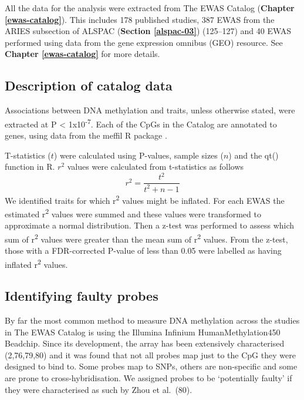 \documentclass[11pt,oneside]{bristolthesis}
\begin{document}
All the data for the analysis were extracted from The EWAS Catalog (\textbf{Chapter \ref{ewas-catalog}}). This includes 178 published studies, 387 EWAS from the ARIES subsection of ALSPAC (\textbf{Section \ref{alspac-03}}) (125--127) and 40 EWAS performed using data from the gene expression omnibus (GEO) resource. See \textbf{Chapter \ref{ewas-catalog}} for more details.

\hypertarget{description-of-data}{%
\subsection*{Description of catalog data}\label{description-of-data}}

Associations between DNA methylation and traits, unless otherwise stated, were extracted at P \textless{} 1x10\textsuperscript{-7}. Each of the CpGs in the Catalog are annotated to genes, using data from the meffil R package .

T-statistics (\(t\)) were calculated using P-values, sample sizes (\(n\)) and the qt() function in R. \(r^2\) values were calculated from t-statistics as follows
\begin{equation}
    r^2 = \frac{t^2} {t^2 + n - 1}
    \label{eq:r-squared}
\end{equation}
We identified traits for which r\textsuperscript{2} values might be inflated. For each EWAS the estimated r\textsuperscript{2} values were summed and these values were transformed to approximate a normal distribution. Then a z-test was performed to assess which sum of r\textsuperscript{2} values were greater than the mean sum of r\textsuperscript{2} values. From the z-test, those with a FDR-corrected P-value of less than 0.05 were labelled as having inflated r\textsuperscript{2} values.

\hypertarget{identifying-faulty-probes}{%
\subsection{Identifying faulty probes}\label{identifying-faulty-probes}}

By far the most common method to measure DNA methylation across the studies in The EWAS Catalog is using the Illumina Infinium HumanMethylation450 Beadchip. Since its development, the array has been extensively characterised (2,76,79,80) and it was found that not all probes map just to the CpG they were designed to bind to. Some probes map to SNPs, others are non-specific and some are prone to cross-hybridisation. We assigned probes to be `potentially faulty' if they were characterised as such by Zhou et al.~(80).
\end{document}
